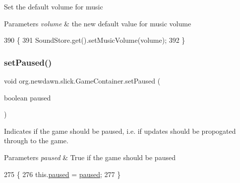 Set the default volume for music 
\begin{DoxyParams}{Parameters}
{\em volume} & the new default value for music volume \\
\hline
\end{DoxyParams}

\begin{DoxyCode}
390                                              \{
391         SoundStore.get().setMusicVolume(volume);
392     \}
\end{DoxyCode}
\mbox{\label{classorg_1_1newdawn_1_1slick_1_1_game_container_a8f4bc4fa90e71731f9ae4a97bba85c69}} 
\subsubsection{\texorpdfstring{set\+Paused()}{setPaused()}}
{\footnotesize\ttfamily void org.\+newdawn.\+slick.\+Game\+Container.\+set\+Paused (\begin{DoxyParamCaption}\item[{boolean}]{paused }\end{DoxyParamCaption})\hspace{0.3cm}{\ttfamily [inline]}}

Indicates if the game should be paused, i.\+e. if updates should be propogated through to the game.


\begin{DoxyParams}{Parameters}
{\em paused} & True if the game should be paused \\
\hline
\end{DoxyParams}

\begin{DoxyCode}
275     \{
276         this.\mbox{\hyperlink{classorg_1_1newdawn_1_1slick_1_1_game_container_ae3b73023cf30def1b0b019f6e60dd022}{paused}} = \mbox{\hyperlink{classorg_1_1newdawn_1_1slick_1_1_game_container_ae3b73023cf30def1b0b019f6e60dd022}{paused}};
277     \}
\end{DoxyCode}
\mbox{\label{classorg_1_1newdawn_1_1slick_1_1_game_container_aebc1dd5b9cf552bd5c4ff52849920360}} 
